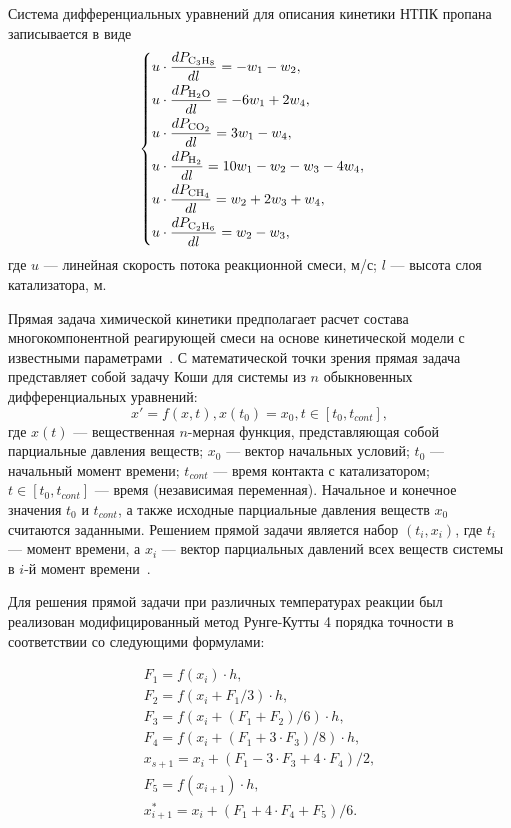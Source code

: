 \documentclass{cmi}
\begin{document}
Система дифференциальных уравнений для описания кинетики НТПК пропана записывается в виде
\begin{equation}
\begin{cases}
\displaystyle u\cdot \frac{dP_{\ce{C3H8}}}{dl} = -w_{1}-w_{2},\\[2mm]
\displaystyle u\cdot \frac{dP_{\ce{H2O}}}{dl} = -6w_{1}+2w_{4},\\[2mm]
\displaystyle u\cdot \frac{dP_{\ce{CO2}}}{dl} = 3w_{1}-w_{4},\\[2mm]
\displaystyle u\cdot \frac{dP_{\ce{H2}}}{dl} = 10w_{1}-w_{2}-w_{3}-4w_{4},\\[2mm]
\displaystyle u\cdot \frac{dP_{\ce{CH4}}}{dl} = w_{2}+2w_{3}+w_{4},\\[2mm]
\displaystyle u\cdot \frac{dP_{\ce{C2H6}}}{dl} = w_{2}-w_{3},
\end{cases}
\end{equation}
где $u$ --- линейная скорость потока реакционной смеси, м/с; $l$ --- высота слоя катализатора, м.

Прямая задача химической кинетики предполагает расчет состава многокомпонентной реагирующей смеси на основе кинетической модели с известными параметрами~.
С математической точки зрения прямая задача представляет собой задачу Коши для системы из $n$ обыкновенных дифференциальных уравнений:
\begin{equation}
x'=f(x, t), x(t_{0}) = x_{0}, t\in[t_{0},t_{cont}],
\end{equation}
где $x(t)$ --- вещественная $n$-мерная функция, представляющая собой парциальные давления веществ; $x_{0}$ --- вектор начальных условий; $t_{0}$ --- начальный момент времени; $t_{cont}$ --- время контакта с катализатором; $t \in [t_{0},t_{cont}]$ --- время (независимая переменная).
Начальное и конечное значения $t_{0}$ и $t_{cont}$, а также исходные парциальные давления веществ $x_{0}$ считаются заданными.
Решением прямой задачи является набор $(t_i, x_i)$, где $t_i$ --- момент времени, а $x_i$ --- вектор парциальных давлений всех веществ системы в $i$-й момент времени~.

Для решения прямой задачи при различных температурах реакции был реализован модифицированный метод Рунге-Кутты 4 порядка точности в соответствии со следующими формулами:

\begin{equation}
\begin{array}{l}
F_{1}=f(x_{i})\cdot h,\\
F_{2}=f(x_{i}+F_{1}/3)\cdot h,\\
F_{3}=f(x_{i}+(F_{1}+F_{2})/6)\cdot h,\\
F_{4}=f(x_{i}+(F_{1}+3 \cdot F_{3})/8)\cdot h,\\
x_{s+1}=x_{i} + (F_{1}-3 \cdot F_{3} + 4 \cdot F_{4})/ 2,\\
F_{5}=f(x_{i+1})\cdot h,\\
x^*_{i+1}=x_{i} + (F_{1}+4 \cdot F_{4} + F_{5})/ 6.\\
\end{array}
\end{equation}
\end{document}
